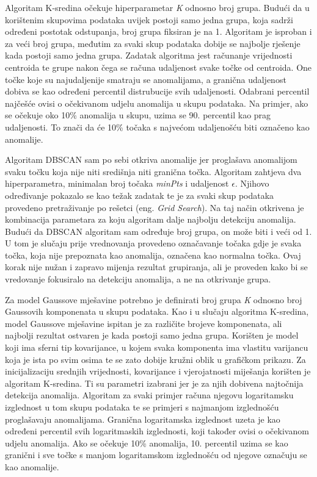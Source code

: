 \documentclass[utf8, diplomski, numeric]{fer}
\begin{document}
Algoritam K-sredina očekuje hiperparametar \textit{K} odnosno broj grupa. Budući da u korištenim skupovima podataka uvijek postoji samo jedna grupa, koja sadrži određeni postotak odstupanja, broj grupa fiksiran je na 1. Algoritam je isproban i za veći broj grupa, međutim za svaki skup podataka dobije se najbolje rješenje kada postoji samo jedna grupa. Zadatak algoritma jest računanje vrijednosti centroida te grupe nakon čega se računa udaljenost svake točke od centroida. One točke koje su najudaljenije smatraju se anomalijama, a granična udaljenost dobiva se kao određeni percentil distrubucije svih udaljenosti. Odabrani percentil najčešće ovisi o očekivanom udjelu anomalija u skupu podataka. Na primjer, ako se očekuje oko 10\% anomalija u skupu, uzima se 90. percentil kao prag udaljenosti. To znači da će 10\% točaka s najvećom udaljenošću biti označeno kao anomalije.

Algoritam DBSCAN sam po sebi otkriva anomalije jer proglašava anomalijom svaku točku koja nije niti središnja niti granična točka. Algoritam zahtjeva dva hiperparametra, minimalan broj točaka \textit{minPts} i udaljenost $\epsilon$. Njihovo određivanje pokazalo se kao težak zadatak te je za svaki skup podataka provedeno pretraživanje po rešetci (eng. \textit{Grid Search}). Na taj način otkrivena je kombinacija parametara za koju algoritam dalje najbolju detekciju anomalija. Budući da DBSCAN algoritam sam određuje broj grupa, on može biti i veći od 1. U tom je slučaju prije vrednovanja provedeno označavanje točaka gdje je svaka točka, koja nije prepoznata kao anomalija, označena kao normalna točka. Ovaj korak nije nužan i zapravo mijenja rezultat grupiranja, ali je proveden kako bi se vredovanje fokusiralo na detekciju anomalija, a ne na otkrivanje grupa.

Za model Gaussove mješavine potrebno je definirati broj grupa \textit{K} odnosno broj Gaussovih komponenata u skupu podataka. Kao i u slučaju algoritma K-sredina, model Gaussove mješavine ispitan je za različite brojeve komponenata, ali najbolji rezultat ostvaren je kada postoji samo jedna grupa. Korišten je model koji ima sferni tip kovarijance, u kojem svaka komponenta ima vlastitu varijancu koja je ista po svim osima te se zato dobije kružni oblik u grafičkom prikazu. Za inicijalizaciju srednjih vrijednosti, kovarijance i vjerojatnosti miješanja korišten je algoritam K-sredina. Ti su parametri izabrani jer je za njih dobivena najtočnija detekcija anomalija. Algoritam za svaki primjer računa njegovu logaritamsku izglednost u tom skupu podataka te se primjeri s najmanjom izglednošću proglašavaju anomalijama. Granična logaritamska izglednost uzeta je kao određeni percentil svih logaritmaskih izglednosti, koji također ovisi o očekivanom udjelu anomalija. Ako se očekuje 10\% anomalija, 10. percentil uzima se kao granični i sve točke s manjom logaritamskom izglednošću od njegove označuju se kao anomalije.
\end{document}
